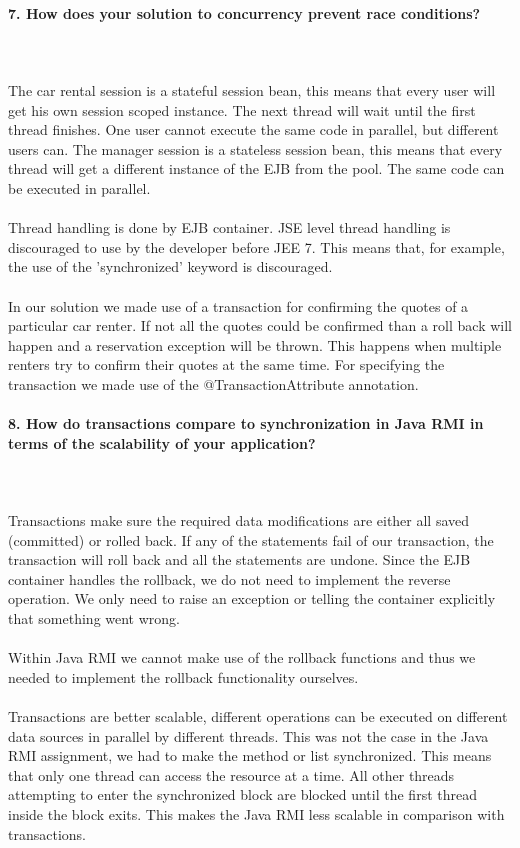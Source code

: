 \documentclass{ds-report}
\begin{document}
	\paragraph{7. How does your solution to concurrency prevent race conditions?} \mbox{}\\\\
The car rental session is a stateful session bean, this means that every user will get his own session scoped instance. The next thread will wait until the first thread finishes. One user cannot execute the same code in parallel, but different users can.
The manager session is a stateless session bean, this means that every thread will get a different instance of the EJB from the pool. The same code can be executed in parallel.\\\\
Thread handling is done by EJB container. JSE level thread handling is discouraged to use by the developer before JEE 7. This means that, for example, the use of the 'synchronized' keyword is discouraged.\\\\
In our solution we made use of a transaction for confirming the quotes of a particular car renter. If not all the quotes could be confirmed than a roll back will happen and a reservation exception will be thrown. This happens when multiple renters try to confirm their quotes at the same time. For specifying the transaction we made use of the @TransactionAttribute annotation.



	\paragraph{8. How do transactions compare to synchronization in Java RMI in terms of the scalability of your application?} \mbox{}\\\\
Transactions make sure the required data modifications are either all saved (committed) or rolled back. If any of the statements fail of our transaction, the transaction will roll back and all the statements are undone. Since the EJB container handles the rollback, we do not need to implement the reverse operation. We only need to raise an exception or telling the container explicitly that something went wrong.\\\\
Within Java RMI we cannot make use of the rollback functions and thus we needed to implement the rollback functionality ourselves.\\\\
Transactions are better scalable, different operations can be executed on different data sources in parallel by different threads. This was not the case in the Java RMI assignment, we had to make the method or list synchronized. This means that only one thread can access the resource at a time. All other threads attempting to enter the synchronized block are blocked until the first thread inside the block exits. This makes the Java RMI less scalable in comparison with transactions.
\end{document}
